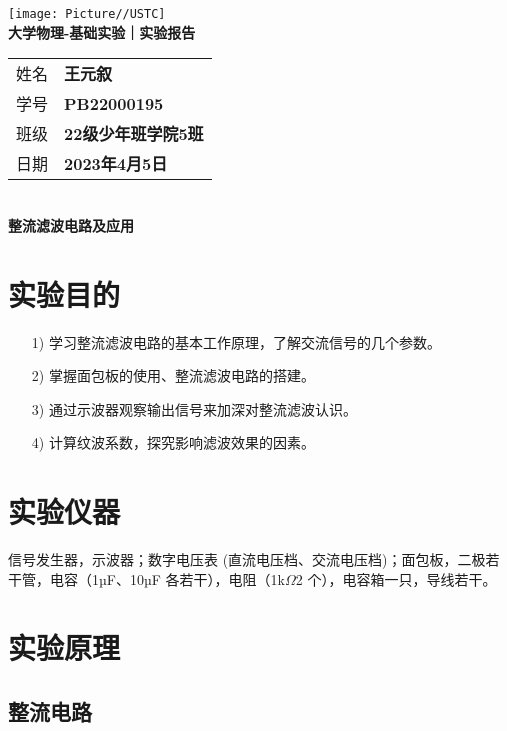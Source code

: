 \documentclass[10pt,a4paper]{article}	%
\begin{document}
	\vspace*{-5em}
	\begin{center}
		\texttt{[image: Picture//USTC]}\\
		\Large \textbf{大学物理-基础实验｜实验报告}\\[5mm]

		\normalsize
		\begin{tabular}{ll}
			姓名 & \textbf{王元叙}\\
			学号 & \textbf{PB22000195}\\
			班级 & \textbf{22级少年班学院5班}\\
			日期 & \textbf{2023年4月5日}\\	
		\end{tabular}\\[5mm]

		\LARGE \textbf{整流滤波电路及应用}\\[5mm]	

	\end{center}

	\section{实验目的}

	\begin{enumerate}
		\item[1)] 学习整流滤波电路的基本工作原理，了解交流信号的几个参数。
		\item[2)] 掌握面包板的使用、整流滤波电路的搭建。
		\item[3)] 通过示波器观察输出信号来加深对整流滤波认识。
		\item[4)] 计算纹波系数，探究影响滤波效果的因素。
	
	\end{enumerate}

	\section{实验仪器}
    信号发生器，示波器；数字电压表 (直流电压档、交流电压档)；面包板，二极若干管，电容（1µF、10µF
    各若干），电阻（1k$\Omega$2 个），电容箱一只，导线若干。

	\section{实验原理}

		\subsection{整流电路}
\end{document}
